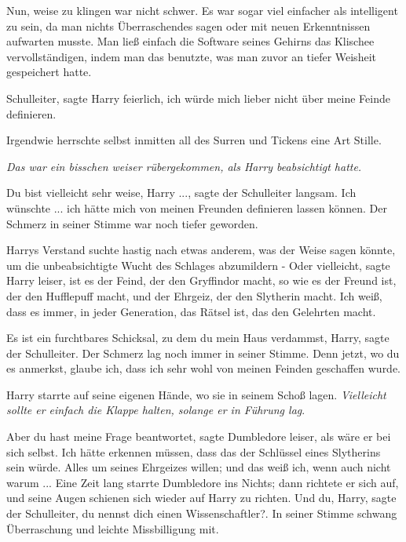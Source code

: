 Nun, weise zu klingen war nicht schwer. Es war sogar viel einfacher als
intelligent zu sein, da man nichts Überraschendes sagen oder mit neuen
Erkenntnissen aufwarten musste. Man ließ einfach die Software seines Gehirns das
Klischee vervollständigen, indem man das benutzte, was man zuvor an tiefer
Weisheit gespeichert hatte.

\glqq{}Schulleiter\grqq{}, sagte Harry feierlich, \glqq{}ich würde mich lieber
nicht über meine Feinde definieren.\grqq{}

Irgendwie herrschte selbst inmitten all des Surren und Tickens eine Art Stille.

\emph{Das war ein bisschen weiser rübergekommen, als Harry beabsichtigt hatte.}

\glqq{}Du bist vielleicht sehr weise, Harry ...\grqq{}, sagte der Schulleiter
langsam. \glqq{}Ich wünschte ... ich hätte mich von meinen Freunden definieren
lassen können.\grqq{} Der Schmerz in seiner Stimme war noch tiefer geworden.

Harrys Verstand suchte hastig nach etwas anderem, was der Weise sagen könnte, um
die unbeabsichtigte Wucht des Schlages abzumildern - \glqq{}Oder
vielleicht\grqq{}, sagte Harry leiser, \glqq{}ist es der Feind, der den
Gryffindor macht, so wie es der Freund ist, der den Hufflepuff macht, und der
Ehrgeiz, der den Slytherin macht. Ich weiß, dass es immer, in jeder Generation,
das Rätsel ist, das den Gelehrten macht.\grqq{}

\glqq{}Es ist ein furchtbares Schicksal, zu dem du mein Haus verdammst,
Harry\grqq{}, sagte der Schulleiter. Der Schmerz lag noch immer in seiner
Stimme. \glqq{}Denn jetzt, wo du es anmerkst, glaube ich, dass ich sehr wohl von
meinen Feinden geschaffen wurde.\grqq{}

Harry starrte auf seine eigenen Hände, wo sie in seinem Schoß lagen.
\emph{Vielleicht sollte er einfach die Klappe halten, solange er in Führung
lag}.

\glqq{}Aber du hast meine Frage beantwortet\grqq{}, sagte Dumbledore leiser, als
wäre er bei sich selbst. \glqq{}Ich hätte erkennen müssen, dass das der Schlüssel
eines Slytherins sein würde. Alles um seines Ehrgeizes willen; und das weiß ich,
wenn auch nicht warum ...\grqq{} Eine Zeit lang starrte Dumbledore ins Nichts;
dann richtete er sich auf, und seine Augen schienen sich wieder auf Harry zu
richten. \glqq{}Und du, Harry\grqq{}, sagte der Schulleiter, \glqq{}du nennst dich
einen Wissenschaftler?\grqq{}. In seiner Stimme schwang Überraschung und leichte
Missbilligung mit.

